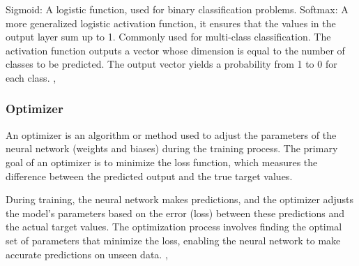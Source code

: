\begin{itemize}
    Sigmoid: A logistic function, used for binary classification problems.
    Softmax: A more generalized logistic activation function, it ensures that the values in the output layer sum up to 1. Commonly used for multi-class classification.
    The activation function outputs a vector whose dimension is equal to the number of classes to be predicted. The output vector yields a probability from 1 to 0 for each class. \cite{schmidhuber2015deep}, \cite{goodfellow2016deep}\\
   
\subsubsection{Optimizer}
An optimizer is an algorithm or method used to adjust the parameters of the neural network (weights and biases) during the training process. The primary goal of an optimizer is to minimize the loss function, which measures the difference between the predicted output and the true target values.

During training, the neural network makes predictions, and the optimizer adjusts the model's parameters based on the error (loss) between these predictions and the actual target values. The optimization process involves finding the optimal set of parameters that minimize the loss, enabling the neural network to make accurate predictions on unseen data. \cite{choi2019empirical}, \cite{ansari2020building} 


\end{itemize}
